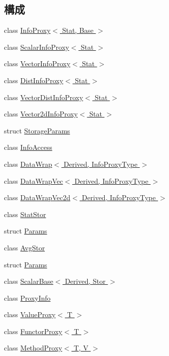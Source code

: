 \subsection*{構成}
\begin{DoxyCompactItemize}
\item 
class \hyperlink{classStats_1_1InfoProxy}{InfoProxy$<$ Stat, Base $>$}
\item 
class \hyperlink{classStats_1_1ScalarInfoProxy}{ScalarInfoProxy$<$ Stat $>$}
\item 
class \hyperlink{classStats_1_1VectorInfoProxy}{VectorInfoProxy$<$ Stat $>$}
\item 
class \hyperlink{classStats_1_1DistInfoProxy}{DistInfoProxy$<$ Stat $>$}
\item 
class \hyperlink{classStats_1_1VectorDistInfoProxy}{VectorDistInfoProxy$<$ Stat $>$}
\item 
class \hyperlink{classStats_1_1Vector2dInfoProxy}{Vector2dInfoProxy$<$ Stat $>$}
\item 
struct \hyperlink{structStats_1_1StorageParams}{StorageParams}
\item 
class \hyperlink{classStats_1_1InfoAccess}{InfoAccess}
\item 
class \hyperlink{classStats_1_1DataWrap}{DataWrap$<$ Derived, InfoProxyType $>$}
\item 
class \hyperlink{classStats_1_1DataWrapVec}{DataWrapVec$<$ Derived, InfoProxyType $>$}
\item 
class \hyperlink{classStats_1_1DataWrapVec2d}{DataWrapVec2d$<$ Derived, InfoProxyType $>$}
\item 
class \hyperlink{classStats_1_1StatStor}{StatStor}
\item 
struct \hyperlink{structStats_1_1StatStor_1_1Params}{Params}
\item 
class \hyperlink{classStats_1_1AvgStor}{AvgStor}
\item 
struct \hyperlink{structStats_1_1AvgStor_1_1Params}{Params}
\item 
class \hyperlink{classStats_1_1ScalarBase}{ScalarBase$<$ Derived, Stor $>$}
\item 
class \hyperlink{classStats_1_1ProxyInfo}{ProxyInfo}
\item 
class \hyperlink{classStats_1_1ValueProxy}{ValueProxy$<$ T $>$}
\item 
class \hyperlink{classStats_1_1FunctorProxy}{FunctorProxy$<$ T $>$}
\item 
class \hyperlink{classStats_1_1MethodProxy}{MethodProxy$<$ T, V $>$}
\item 

\end{DoxyCompactItemize}
